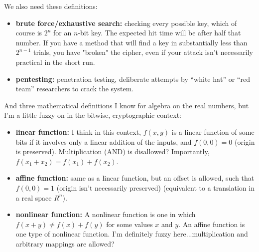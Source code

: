 We also need these definitions:

\begin{itemize}
\item {\bf brute force/exhaustive search:} checking every possible key, which of
  course is $2^n$ for an $n$-bit key.  The expected hit time will be
  after half that number.  If you have a method that will find a
  key in substantially less than $2^{n-1}$ trials, you have "broken" the
  cipher, even if your attack isn't necessarily practical in the short
  run.
\item {\bf pentesting:} penetration testing, deliberate attempts by
  ``white hat'' or ``red team'' researchers to crack the system.
\end{itemize}

\aonolook{}
And three mathematical definitions I know for algebra on the real
numbers, but I'm a little fuzzy on in the bitwise, cryptographic
context:

\begin{itemize}
\item {\bf linear function:} I think in this context, $f(x,y)$ is a linear
  function of some bits if it involves only a linear addition of
  the inputs, and $f(0,0) = 0$ (origin is preserved).  Multiplication
  (AND) is disallowed?  Importantly, $f(x_1 + x_2) = f(x_1) + f(x_2)$.
\item {\bf affine function:} same as a linear function, but an offset is
  allowed, such that $f(0,0) = 1$ (origin isn't necessarily preserved)
  (equivalent to a translation in a real space $R^n$).
\item {\bf nonlinear function:} A nonlinear function is one in which $f(x+y) \ne f(x) + f(y)$ for some values $x$ and $y$. An affine function is one type of nonlinear function. I'm definitely fuzzy here...multiplication and
  arbitrary mappings are allowed?
\end{itemize}

